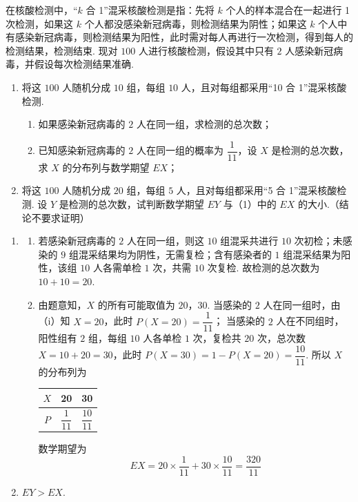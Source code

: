 \begin{problem}
在核酸检测中，“\(k\) 合 1”混采核酸检测是指：先将 \(k\) 个人的样本混合在一起进行 1 次检测，如果这 \(k\) 个人都没感染新冠病毒，则检测结果为阴性；如果这 \(k\) 个人中有感染新冠病毒，则检测结果为阳性，此时需对每人再进行一次检测，得到每人的检测结果，检测结束. 现对 \(100\) 人进行核酸检测，假设其中只有 \(2\) 人感染新冠病毒，并假设每次检测结果准确.

\begin{enumerate}
    \item 将这 \(100\) 人随机分成 \(10\) 组，每组 \(10\) 人，且对每组都采用“10 合 1”混采核酸检测.
    \begin{enumerate}
        \item 如果感染新冠病毒的 \(2\) 人在同一组，求检测的总次数；
        \item 已知感染新冠病毒的 \(2\) 人在同一组的概率为 \(\dfrac{1}{11}\)，设 \(X\) 是检测的总次数，求 \(X\) 的分布列与数学期望 \(EX\)；
    \end{enumerate}
    \item 将这 \(100\) 人随机分成 \(20\) 组，每组 \(5\) 人，且对每组都采用“5 合 1”混采核酸检测. 设 \(Y\) 是检测的总次数，试判断数学期望 \(EY\) 与（1）中的 \(EX\) 的大小.（结论不要求证明）
\end{enumerate}
\end{problem}

\begin{solution}
\begin{enumerate}
    \item
    \begin{enumerate}
        \item 若感染新冠病毒的 \(2\) 人在同一组，则这 \(10\) 组混采共进行 \(10\) 次初检；未感染的 \(9\) 组混采结果均为阴性，无需复检；含有感染者的 \(1\) 组混采结果为阳性，该组 \(10\) 人各需单检 \(1\) 次，共需 \(10\) 次复检. 故检测的总次数为 \(10+10=20\).
        \item 由题意知，\(X\) 的所有可能取值为 \(20\)，\(30\).
当感染的 \(2\) 人在同一组时，由（i）知 \(X=20\)，此时 \(P(X=20)=\dfrac{1}{11}\)；
当感染的 \(2\) 人在不同组时，阳性组有 \(2\) 组，每组 \(10\) 人各单检 \(1\) 次，复检共 \(20\) 次，总次数 \(X=10+20=30\)，此时 \(P(X=30)=1-P(X=20)=\dfrac{10}{11}\).
所以 \(X\) 的分布列为
\begin{center}
\begin{tabular}{|c|c|c|}
\hline
\(X\) & 20 & 30 \\
\hline
\(P\) & \(\dfrac{1}{11}\) & \(\dfrac{10}{11}\) \\
\hline
\end{tabular}
\end{center}
数学期望为
\[
EX=20\times\frac{1}{11}+30\times\frac{10}{11}=\frac{320}{11}
\]
    \end{enumerate}
    \item \(EY>EX\).
\end{enumerate}
\end{solution}

